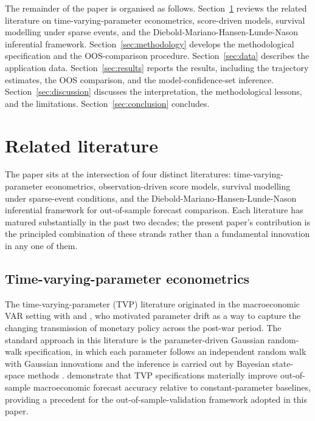 \documentclass[12pt,a4paper]{article}
\theoremstyle{plain}
\theoremstyle{definition}
\begin{document}
The remainder of the paper is organised as follows. Section~\ref{sec:literature} reviews the related literature on time-varying-parameter econometrics, score-driven models, survival modelling under sparse events, and the Diebold-Mariano-Hansen-Lunde-Nason inferential framework. Section~\ref{sec:methodology} develops the methodological specification and the OOS-comparison procedure. Section~\ref{sec:data} describes the application data. Section~\ref{sec:results} reports the results, including the trajectory estimates, the OOS comparison, and the model-confidence-set inference. Section~\ref{sec:discussion} discusses the interpretation, the methodological lessons, and the limitations. Section~\ref{sec:conclusion} concludes.

\section{Related literature}
\label{sec:literature}

The paper sits at the intersection of four distinct literatures: time-varying-parameter econometrics, observation-driven score models, survival modelling under sparse-event conditions, and the Diebold-Mariano-Hansen-Lunde-Nason inferential framework for out-of-sample forecast comparison. Each literature has matured substantially in the past two decades; the present paper's contribution is the principled combination of these strands rather than a fundamental innovation in any one of them.

\subsection{Time-varying-parameter econometrics}

The time-varying-parameter (TVP) literature originated in the macroeconomic VAR setting with \cite{cogley2005drifts} and \cite{primiceri2005time}, who motivated parameter drift as a way to capture the changing transmission of monetary policy across the post-war period. The standard approach in this literature is the parameter-driven Gaussian random-walk specification, in which each parameter follows an independent random walk with Gaussian innovations and the inference is carried out by Bayesian state-space methods \citep{durbin2012time}. \cite{dagostino2013macroeconomic} demonstrate that TVP specifications materially improve out-of-sample macroeconomic forecast accuracy relative to constant-parameter baselines, providing a precedent for the out-of-sample-validation framework adopted in this paper.
\end{document}
